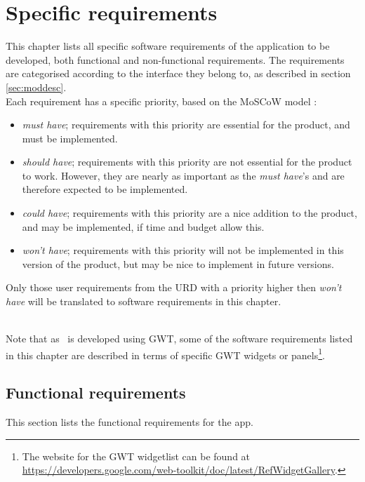 \chapter{Specific requirements}
\label{chap:specreq}
This chapter lists all specific software requirements of the application to be developed, both functional and non-functional requirements. The requirements are categorised according to the interface they belong to, as described in section \ref{sec:moddesc}. \\
Each requirement has a specific priority, based on the MoSCoW model \cite{moscow}:

\begin{itemize}
    \item \emph{must have}; requirements with this priority are essential for the product, and must be implemented.
    \item \emph{should have}; requirements with this priority are not essential for the product to work. However, they are nearly as important as the \emph{must have}'s and are therefore expected to be implemented.
    \item \emph{could have}; requirements with this priority are a nice addition to the product, and may be implemented, if time and budget allow this.
    \item \emph{won't have}; requirements with this priority will not be implemented in this version of the product, but may be nice to implement in future versions.
\end{itemize}

Only those user requirements from the URD \cite{urd} with a priority higher then \emph{won't have} will be translated to software requirements in this chapter.

 \\
Note that as \applicationname\ is developed using GWT, some of the software requirements listed in this chapter are described in terms of specific GWT widgets or panels\footnote{The website for the GWT widgetlist can be found at \url{https://developers.google.com/web-toolkit/doc/latest/RefWidgetGallery}.}.


\section{Functional requirements}
This section lists the functional requirements for the \projectname app.

